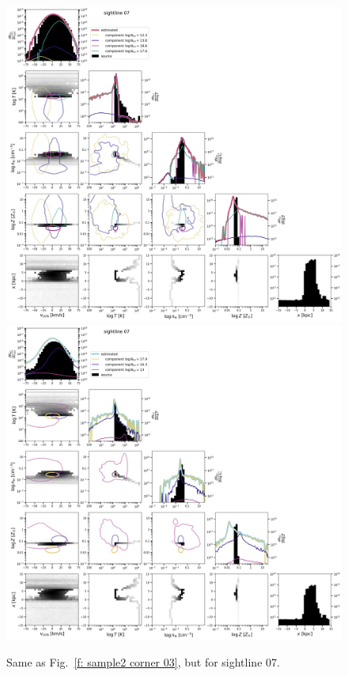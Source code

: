 \documentclass[fleqn,usenatbib]{mnras}
\begin{document}
\begin{figure}
    \centering
    \includegraphics[height=0.45\textheight]{figures/sample2/original/sightline_0007.png}
    \includegraphics[height=0.45\textheight]{figures/sample2/high-z/sightline_0007.png}
    \label{f: sample2 07 corner}
    \caption{Same as Fig.~\ref{f: sample2 corner 03}, but for sightline 07.}
\end{figure}
\end{document}
